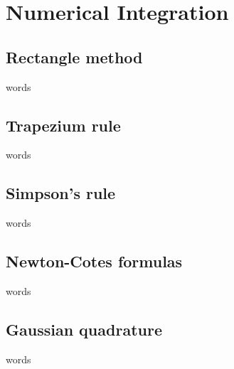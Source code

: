 \chapter{Numerical Integration}


\section{Rectangle method}
words

\section{Trapezium rule}
words

\section{Simpson's rule}
words

\section{Newton-Cotes formulas}
words

\section{Gaussian quadrature}
words


